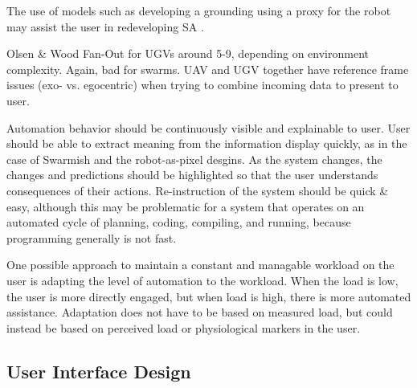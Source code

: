 \documentclass[]{article}
\begin{document}
The use of models such as developing a grounding using a proxy for the robot may assist the user in redeveloping SA \cite{stubbs2008using}. 

Olsen \& Wood Fan-Out for UGVs around 5-9, depending on environment complexity. Again, bad for swarms. UAV and UGV together have reference frame issues (exo- vs. egocentric) when trying to combine incoming data to present to user. 

Automation behavior should be continuously visible and explainable to user. 
User should be able to extract meaning from the information display quickly, as in the case of Swarmish and the robot-as-pixel desgins.
As the system changes, the changes and predictions should be highlighted so that the user understands consequences of their actions. 
Re-instruction of the system should be quick \& easy, although this may be problematic for a system that operates on an automated cycle of planning, coding, compiling, and running, because programming generally is not fast.

One possible approach to maintain a constant and managable workload on the user is adapting the level of automation to the workload. 
When the load is low, the user is more directly engaged, but when load is high, there is more automated assistance. 
Adaptation does not have to be based on measured load, but could instead be based on perceived load or physiological markers in the user. 


\subsection{User Interface Design}
\end{document}

